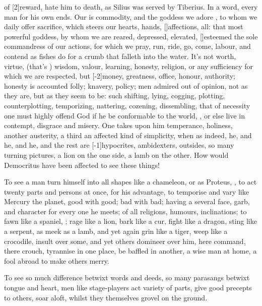 {of [2\baselineskip]reward, hate him to death, as Silius was served by Tiberius. In
a word, every man for his own ends. Our  is commodity, and
the goddess we adore , to whom we daily offer
sacrifice, which steers our hearts, hands, [\baselineskip]affections, all: that
most powerful goddess, by whom we are reared, depressed, elevated,
[\baselineskip]esteemed the sole commandress of our actions, for which we pray,
run, ride, go, come, labour, and contend as fishes do for a crumb that
falleth into the water. It's not worth, virtue, (that's ) wisdom, valour, learning, honesty, religion, or any
sufficiency for which we are respected, but [-2\baselineskip]money, greatness,
office, honour, authority; honesty is accounted folly; knavery, policy;
men admired out of opinion, not as they are, but as they seem to
be: such shifting, lying, cogging, plotting, counterplotting,
temporizing, nattering, cozening, dissembling, that of necessity
one must highly offend God if he be conformable to the world, , or else live in contempt, disgrace and misery. One takes
upon him temperance, holiness, another austerity, a third an affected
kind of simplicity, when as indeed, he, and he, and he, and the rest
are [-1\baselineskip]hypocrites, ambidexters, outsides, so many turning pictures, a
lion on the one side, a lamb on the other. How would Democritus
have been affected to see these things!

To see a man turn himself into all shapes like a chameleon, or as
Proteus, , to act twenty parts
and persons at once, for his advantage, to temporise and vary like
Mercury the planet, good with good; bad with bad; having a several
face, garb, and character for every one he meets; of all religions,
humours, inclinations; to fawn like a spaniel, ; rage like a lion, bark like a cur, fight like a dragon, sting
like a serpent, as meek as a lamb, and yet again grin like a tiger,
weep like a crocodile, insult over some, and yet others domineer over
him, here command, there crouch, tyrannise in one place, be baffled in
another, a wise man at home, a fool abroad to make others merry.

To see so much difference betwixt words and deeds, so many parasangs
betwixt tongue and heart, men like stage-players act variety of parts,
give good precepts to others, soar aloft, whilst they themselves
grovel on the ground.

}
